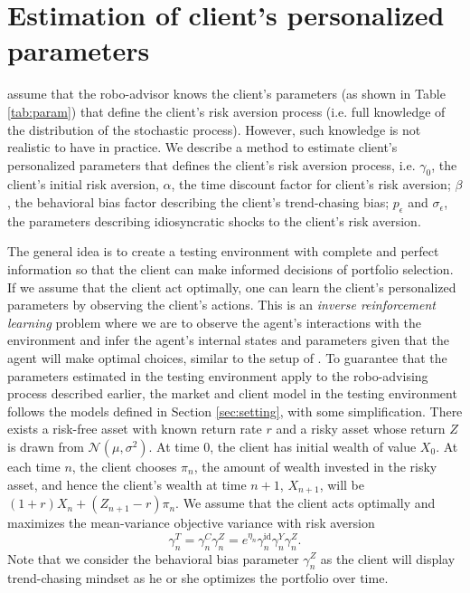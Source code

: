 \section{Estimation of client's personalized parameters}\label{sec:est}
 assume that the robo-advisor knows the client's parameters (as shown in Table \ref{tab:param}) that define the client's risk aversion process (i.e. full knowledge of the distribution of the stochastic process). However, such knowledge is not realistic to have in practice. We describe a method to estimate client's personalized parameters that defines the client's risk aversion process, i.e. $\gamma_0$, the client's initial risk aversion, $\alpha$, the time discount factor for client's risk aversion; $\beta$, the behavioral bias factor describing the client's trend-chasing bias; $p_{\epsilon}$ and $\sigma_{\epsilon}$, the parameters describing idiosyncratic shocks to the client’s risk aversion.

The general idea is to create a testing environment with complete and perfect information so that the client can make informed decisions of portfolio selection. If we assume that the client act optimally, one can learn the client's personalized parameters by observing the client's actions. This is an \textit{inverse reinforcement learning} problem \cite{ng2000algorithms} where we are to observe the agent's interactions with the environment and infer the agent's internal states and parameters given that the agent will make optimal choices, similar to the setup of . To guarantee that the parameters estimated in the testing environment apply to the robo-advising process described earlier, the market and client model in the testing environment follows the models defined in Section \ref{sec:setting}, with some simplification. There exists a risk-free asset with known return rate $r$ and a risky asset whose return $Z$ is drawn from $\mathcal{N}(\mu, \sigma^2)$. At time $0$, the client has initial wealth of value $X_0$. At each time $n$, the client chooses $\pi_n$, the amount of wealth invested in the risky asset, and hence the client's wealth at time $n+1$, $X_{n+1}$, will be $(1+r)X_{n}+(Z_{n+1}-r)\pi_n$. We assume that the client acts optimally and maximizes the mean-variance objective variance with risk aversion $$\gamma_n^T=\gamma_n^C\gamma_n^Z=e^{\eta_n}\gamma_n^{\text{id}}\gamma_n^Y\gamma_n^Z.$$ Note that we consider the behavioral bias parameter $\gamma_n^Z$ as the client will display trend-chasing mindset as he or she optimizes the portfolio over time.

